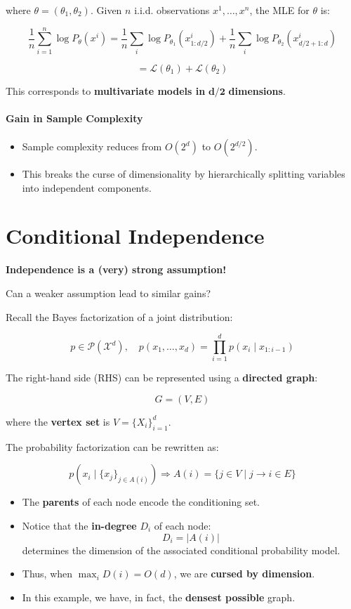 \documentclass{article}%
\begin{document}
where $\theta = (\theta_1, \theta_2)$.
Given $n$ i.i.d. observations $x^1, \dots, x^n$, the MLE for $\theta$ is:

\[
\frac{1}{n} \sum_{i=1}^{n} \log P_{\theta}(x^i) = \frac{1}{n} \sum_{i} \log P_{\theta_1}(x^i_{1:d/2}) + \frac{1}{n} \sum_{i} \log P_{\theta_2}(x^i_{d/2+1:d})
\]

\[
= \mathcal{L}(\theta_1) + \mathcal{L}(\theta_2)
\]

This corresponds to \textbf{multivariate models in} $\mathbf{d/2}$ \textbf{dimensions}.

\paragraph{Gain in Sample Complexity}
\begin{itemize}
    \item Sample complexity reduces from $O(2^d)$ to $O(2^{d/2})$.
    \item This breaks the curse of dimensionality by hierarchically splitting variables into independent components.
\end{itemize}





\section*{Conditional Independence}
\textbf{Independence is a (very) strong assumption!} 

Can a weaker assumption lead to similar gains?

Recall the Bayes factorization of a joint distribution:

\[
p \in \mathcal{P}(\mathcal{X}^d), \quad p(x_1, \dots, x_d) = \prod_{i=1}^{d} p(x_i \mid x_{1:i-1})
\]

The right-hand side (RHS) can be represented using a \textbf{directed graph}:

\[
G = (V, E)
\]

where the \textbf{vertex set} is \( V = \{X_i\}_{i=1}^{d} \).

The probability factorization can be rewritten as:

\[
p(x_i \mid \{x_j\}_{j \in A(i)}) \Rightarrow A(i) = \{ j \in V \mid j \to i \in E \}
\]

\begin{itemize}
    \item The \textbf{parents} of each node encode the conditioning set.
    \item Notice that the \textbf{in-degree} \( D_i \) of each node:
          \[
          D_i = | A(i) |
          \]
          determines the dimension of the associated conditional probability model.
    \item Thus, when \( \max_i D(i) = O(d) \), we are \textbf{cursed by dimension}.
    \item In this example, we have, in fact, the \textbf{densest possible} graph.
\end{itemize}
\end{document}
